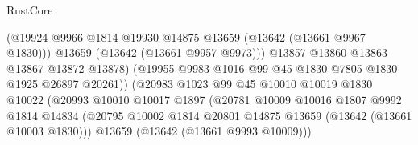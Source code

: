 \begin{lexlean}{RustCore}
\begin{coremodule}
                                          (@19924
                                            @9966
                                            @1814
                                            @19930
                                            @14875
                                            @13659
                                            (@13642 (@13661 @9967 @1830)))
                                          @13659
                                          (@13642 (@13661 @9957 @9973)))
                                        @13857
                                        @13860
                                        @13863
                                        @13867
                                        @13872
                                        @13878)
                                      (@19955
                                        @9983
                                        @1016
                                        @99
                                        @45
                                        @1830
                                        @7805
                                        @1830
                                        @1925
                                        @26897
                                        @20261))
                                    (@20983
                                      @1023
                                      @99
                                      @45
                                      @10010
                                      @10019
                                      @1830
                                      @10022
                                      (@20993
                                        @10010
                                        @10017
                                        @1897
                                        (@20781
                                          @10009
                                          @10016
                                          @1807
                                          @9992
                                          @1814
                                          @14834
                                          (@20795
                                            @10002
                                            @1814
                                            @20801
                                            @14875
                                            @13659
                                            (@13642 (@13661 @10003 @1830)))
                                          @13659
                                          (@13642 (@13661 @9993 @10009)))

\end{coremodule}
\end{lexlean}
